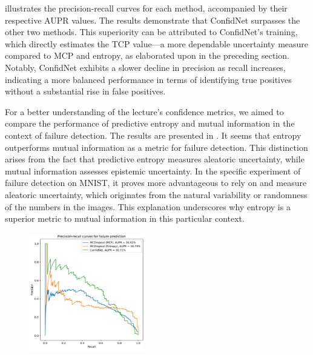  illustrates the precision-recall curves for each method, accompanied by their respective AUPR values. The results demonstrate that ConfidNet surpasses the other two methods. This superiority can be attributed to ConfidNet's training, which directly estimates the TCP value—a more dependable uncertainty measure compared to MCP and entropy, as elaborated upon in the preceding section. Notably, ConfidNet exhibits a slower decline in precision as recall increases, indicating a more balanced performance in terms of identifying true positives without a substantial rise in false positives.

For a better understanding of the lecture's confidence metrics, we aimed to compare the performance of predictive entropy and mutual information in the context of failure detection. The results are presented in . It seems that entropy outperforms mutual information as a metric for failure detection. This distinction arises from the fact that predictive entropy measures aleatoric uncertainty, while mutual information assesses epistemic uncertainty. In the specific experiment of failure detection on MNIST, it proves more advantageous to rely on and measure aleatoric uncertainty, which originates from the natural variability or randomness of the numbers in the images. This explanation underscores why entropy is a superior metric to mutual information in this particular context.

\begin{figure}[H]
    \centering
    \includegraphics[width=0.45\textwidth]{failure_aupr.pdf}
    \caption{}
    \label{fig:failure_aupr}
\end{figure}

\begin{figure}[H]
    \centering
    \caption{}
    \label{fig:failure_aupr_entropy_vs_mut_inf}
\end{figure}

